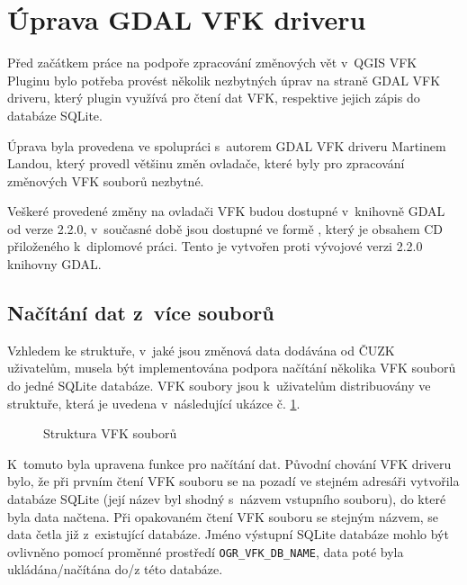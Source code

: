 \documentclass[a4paper,12pt,oneside]{book}
\begin{document}
\clearpage
\section{Úprava GDAL VFK driveru}
\label{l_uprava_gdal}
Před začátkem práce na podpoře zpracování změnových vět v~QGIS VFK
Pluginu bylo potřeba provést několik nezbytných úprav na straně GDAL
VFK driveru, který plugin využívá pro čtení dat VFK, respektive jejich
zápis do databáze SQLite.

Úprava byla provedena ve spolupráci s~autorem GDAL VFK driveru
Martinem Landou, který provedl většinu změn ovladače, které byly pro
zpracování změnových VFK souborů nezbytné.

Veškeré provedené změny na ovladači VFK budou dostupné v~knihovně GDAL
od verze 2.2.0, v~současné době jsou dostupné ve formě ,
který je obsahem CD přiloženého k~diplomové práci. Tento  je
vytvořen proti vývojové verzi 2.2.0 knihovny GDAL.

\subsection{Načítání dat z~více souborů}
Vzhledem ke struktuře, v~jaké jsou změnová data dodávána od ČUZK
uživatelům, musela být implementována podpora načítání několika VFK
souborů do jedné SQLite databáze. VFK soubory jsou k~uživatelům
distribuovány ve struktuře, která je uvedena v~následující ukázce
č. \ref{l_struktura_sireni_vfk}.

\begin{figure}[htb]
\centering
\begin{minipage}{0.9\textwidth}
\end{minipage}
\caption{Struktura VFK souborů}
\label{l_struktura_sireni_vfk}
\end{figure}

K~tomuto byla upravena funkce pro načítání dat. Původní chování VFK
driveru bylo, že při prvním čtení VFK souboru se na pozadí ve stejném
adresáři vytvořila databáze SQLite (její název byl shodný s~názvem
vstupního souboru), do které byla data načtena. Při opakovaném čtení
VFK souboru se stejným názvem, se data četla již z~existující
databáze. Jméno výstupní SQLite databáze mohlo být ovlivněno pomocí
proměnné prostředí \texttt{OGR\_VFK\_DB\_NAME}, data poté byla
ukládána/načítána do/z této databáze.
\end{document}
